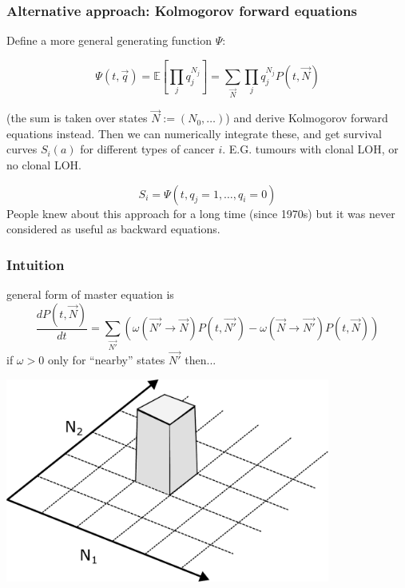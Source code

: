 \documentclass{beamer}
\begin{document}
\begin{frame}
    \frametitle{Alternative approach: Kolmogorov forward equations}
    Define a more general generating function $\Psi$:

    \begin{equation}
        \Psi(t, \vec{q}) = \mathbb{E}\left[\prod_j q_j^{N_j}\right] =
        \sum_{\vec{N}} \prod_j q_j^{N_j} P(t, \vec{N})
    \end{equation}

    (the sum is taken over states $\vec{N} := (N_0, \dots)$) and derive Kolmogorov forward equations instead. Then we can numerically
    integrate these, and get survival curves $S_i(a)$ for different types of
    cancer $i$. E.G. tumours with clonal LOH, or no clonal LOH.

    \begin{equation}
        S_i = \Psi(t, q_j =1, \dots, q_i = 0)
    \end{equation}
    People knew about this approach for a long time (since 1970s) but it was never
    considered as useful as backward equations.

\end{frame}

\begin{frame}
    \frametitle{Intuition}
    general form of master equation is
    \begin{equation}
        \frac{dP(t, \vec{N})}{dt} = \sum_{\vec{N'}} \left(
        \omega(\vec{N'} \rightarrow \vec{N}) P(t, \vec{N'})
        - \omega(\vec{N} \rightarrow \vec{N'}) P(t, \vec{N})
        \right)
    \end{equation}
    if $\omega > 0$ only for ``nearby'' states $\vec{N'}$ then...

    \includegraphics[width=0.8\textwidth]{figures/intuition}
\end{frame}
\end{document}
